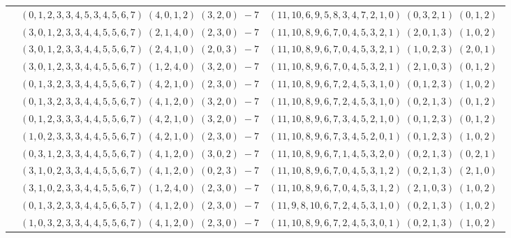\documentclass[11pt]{article}
\begin{document}
\begin{longtable}[l]{|c|c|c|}
 \cline{2-3} 
 & $(0 ,1 ,2 ,3 ,3 ,4 ,5 ,3 ,4 ,5 ,6 ,7) \;(4 ,0 ,1 ,2) \;(3 ,2 ,0) \;-7$ & $(11 ,10 ,6 ,9 ,5 ,8 ,3 ,4 ,7 ,2 ,1 ,0) \;(0 ,3 ,2 ,1) \;(0 ,1 ,2) \;$\\ 
 \cline{2-3} 
 & $(3 ,0 ,1 ,2 ,3 ,3 ,4 ,4 ,5 ,5 ,6 ,7) \;(2 ,1 ,4 ,0) \;(2 ,3 ,0) \;-7$ & $(11 ,10 ,8 ,9 ,6 ,7 ,0 ,4 ,5 ,3 ,2 ,1) \;(2 ,0 ,1 ,3) \;(1 ,0 ,2) \;$\\ 
 \cline{2-3} 
 & $(3 ,0 ,1 ,2 ,3 ,3 ,4 ,4 ,5 ,5 ,6 ,7) \;(2 ,4 ,1 ,0) \;(2 ,0 ,3) \;-7$ & $(11 ,10 ,8 ,9 ,6 ,7 ,0 ,4 ,5 ,3 ,2 ,1) \;(1 ,0 ,2 ,3) \;(2 ,0 ,1) \;$\\ 
 \cline{2-3} 
 & $(3 ,0 ,1 ,2 ,3 ,3 ,4 ,4 ,5 ,5 ,6 ,7) \;(1 ,2 ,4 ,0) \;(3 ,2 ,0) \;-7$ & $(11 ,10 ,8 ,9 ,6 ,7 ,0 ,4 ,5 ,3 ,2 ,1) \;(2 ,1 ,0 ,3) \;(0 ,1 ,2) \;$\\ 
 \cline{2-3} 
 & $(0 ,1 ,3 ,2 ,3 ,3 ,4 ,4 ,5 ,5 ,6 ,7) \;(4 ,2 ,1 ,0) \;(2 ,3 ,0) \;-7$ & $(11 ,10 ,8 ,9 ,6 ,7 ,2 ,4 ,5 ,3 ,1 ,0) \;(0 ,1 ,2 ,3) \;(1 ,0 ,2) \;$\\ 
 \cline{2-3} 
 & $(0 ,1 ,3 ,2 ,3 ,3 ,4 ,4 ,5 ,5 ,6 ,7) \;(4 ,1 ,2 ,0) \;(3 ,2 ,0) \;-7$ & $(11 ,10 ,8 ,9 ,6 ,7 ,2 ,4 ,5 ,3 ,1 ,0) \;(0 ,2 ,1 ,3) \;(0 ,1 ,2) \;$\\ 
 \cline{2-3} 
 & $(0 ,1 ,2 ,3 ,3 ,3 ,4 ,4 ,5 ,5 ,6 ,7) \;(4 ,2 ,1 ,0) \;(3 ,2 ,0) \;-7$ & $(11 ,10 ,8 ,9 ,6 ,7 ,3 ,4 ,5 ,2 ,1 ,0) \;(0 ,1 ,2 ,3) \;(0 ,1 ,2) \;$\\ 
 \cline{2-3} 
 & $(1 ,0 ,2 ,3 ,3 ,3 ,4 ,4 ,5 ,5 ,6 ,7) \;(4 ,2 ,1 ,0) \;(2 ,3 ,0) \;-7$ & $(11 ,10 ,8 ,9 ,6 ,7 ,3 ,4 ,5 ,2 ,0 ,1) \;(0 ,1 ,2 ,3) \;(1 ,0 ,2) \;$\\ 
 \cline{2-3} 
 & $(0 ,3 ,1 ,2 ,3 ,3 ,4 ,4 ,5 ,5 ,6 ,7) \;(4 ,1 ,2 ,0) \;(3 ,0 ,2) \;-7$ & $(11 ,10 ,8 ,9 ,6 ,7 ,1 ,4 ,5 ,3 ,2 ,0) \;(0 ,2 ,1 ,3) \;(0 ,2 ,1) \;$\\ 
 \cline{2-3} 
 & $(3 ,1 ,0 ,2 ,3 ,3 ,4 ,4 ,5 ,5 ,6 ,7) \;(4 ,1 ,2 ,0) \;(0 ,2 ,3) \;-7$ & $(11 ,10 ,8 ,9 ,6 ,7 ,0 ,4 ,5 ,3 ,1 ,2) \;(0 ,2 ,1 ,3) \;(2 ,1 ,0) \;$\\ 
 \cline{2-3} 
 & $(3 ,1 ,0 ,2 ,3 ,3 ,4 ,4 ,5 ,5 ,6 ,7) \;(1 ,2 ,4 ,0) \;(2 ,3 ,0) \;-7$ & $(11 ,10 ,8 ,9 ,6 ,7 ,0 ,4 ,5 ,3 ,1 ,2) \;(2 ,1 ,0 ,3) \;(1 ,0 ,2) \;$\\ 
 \cline{2-3} 
 & $(0 ,1 ,3 ,2 ,3 ,3 ,4 ,4 ,5 ,6 ,5 ,7) \;(4 ,1 ,2 ,0) \;(2 ,3 ,0) \;-7$ & $(11 ,9 ,8 ,10 ,6 ,7 ,2 ,4 ,5 ,3 ,1 ,0) \;(0 ,2 ,1 ,3) \;(1 ,0 ,2) \;$\\ 
 \cline{2-3} 
 & $(1 ,0 ,3 ,2 ,3 ,3 ,4 ,4 ,5 ,5 ,6 ,7) \;(4 ,1 ,2 ,0) \;(2 ,3 ,0) \;-7$ & $(11 ,10 ,8 ,9 ,6 ,7 ,2 ,4 ,5 ,3 ,0 ,1) \;(0 ,2 ,1 ,3) \;(1 ,0 ,2) \;$\\ 

\end{longtable}
\end{document}

